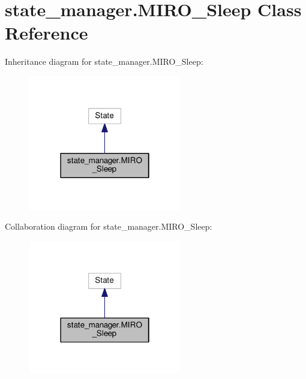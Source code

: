 \hypertarget{classstate__manager_1_1MIRO__Sleep}{}\section{state\+\_\+manager.\+M\+I\+R\+O\+\_\+\+Sleep Class Reference}
\label{classstate__manager_1_1MIRO__Sleep}


Inheritance diagram for state\+\_\+manager.\+M\+I\+R\+O\+\_\+\+Sleep\+:\nopagebreak
\begin{figure}[H]
\begin{center}
\leavevmode
\includegraphics[width=190pt]{classstate__manager_1_1MIRO__Sleep__inherit__graph}
\end{center}
\end{figure}


Collaboration diagram for state\+\_\+manager.\+M\+I\+R\+O\+\_\+\+Sleep\+:\nopagebreak
\begin{figure}[H]
\begin{center}
\leavevmode
\includegraphics[width=190pt]{classstate__manager_1_1MIRO__Sleep__coll__graph}
\end{center}
\end{figure}
